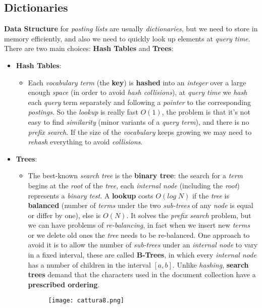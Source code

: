 \documentclass{article}
\begin{document}
\subsection{Dictionaries}
\textbf{Data Structure} for \emph{posting lists} are usually \emph{dictionaries}, but we need to store in memory efficiently, and also we need to quickly look up elements at \emph{query time}. There are two main choices: \textbf{Hash Tables} and \textbf{Trees}:
\begin{itemize}
\item \textbf{Hash Tables}:
\begin{itemize}
\item Each \emph{vocabulary term} (the \textbf{key}) is \textbf{hashed} into an \emph{integer} over a large enough \emph{space} (in order to avoid \emph{hash collisions}), at \emph{query time} we \emph{hash} each \emph{query} term separately and following a \emph{pointer} to the corresponding \emph{postings}. So the \emph{lookup} is really fast $O(1)$, the problem is that it's not easy to find \emph{similarity} (minor variants of a \emph{query term}), and there is no \emph{prefix search}. If the size of the \emph{vocabulary} keeps growing we may need to \emph{rehash} everything to avoid \emph{collisions}. 
\end{itemize}
\item \textbf{Trees}:
\begin{itemize}
\item The best-known \emph{search tree} is the \textbf{binary tree}: the search for a \emph{term} begins at the \emph{root} of the \emph{tree}, each \emph{internal node} (including the \emph{root}) represents a \emph{binary test}. A \textbf{lookup} costs $O(log\;N)$ if the \emph{tree} is \textbf{balanced} (number of \emph{terms} under the two \emph{sub-trees} of any \emph{node} is equal or differ by one), else is $O(N)$. It solves the \emph{prefix search} problem, but we can have problems of\emph{ re-balancing}, in fact when we insert new \emph{terms} or we delete old ones the \emph{tree} needs to be re-balanced. One approach to avoid it is to allow the number of \emph{sub-trees} under an \emph{internal node} to vary in a fixed interval, these are called \textbf{B-Trees}, in which every \emph{internal node} has a number of children in the interval $\left [a,b\right]$. Unlike \emph{hashing}, \textbf{search trees} demand that the characters used in the document collection have a \textbf{prescribed ordering}.
 \begin{figure}[H]
  \centering
  \texttt{[image: cattura8.png]}
\end{figure}
\end{itemize}
\end{itemize}
\end{document}
